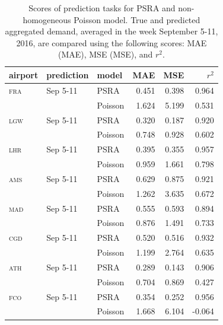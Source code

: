 \documentclass[final,review]{elsarticle}
\newcommand{\airp}[1]{\textcolor{#1}{\textsc{#1}}}
\begin{document}
\begin{table}
  \centering
  \caption{Scores of prediction tasks for \acs{PSRA} and non-homogeneous Poisson model. True and predicted aggregated demand, averaged in the week September 5-11, 2016, are compared using the following scores: \acl{MAE} (\acs{MAE}), \acl{MSE} (\acs{MSE}), and \(r^2\).}
  \label{tab:predictions_last_week}
  \begin{tabular}{lllrrr}
    \toprule
    airport    & prediction & model & \acs{MAE} & \acs{MSE} & \(r^2\)  \\
    \midrule
    \airp{fra} & Sep 5-11  & \acs{PSRA} &  0.451 &   0.398 &  0.964 \\
         &                  & Poisson    &  1.624 &   5.199 &  0.531 \\
    \airp{lgw} & Sep 5-11  & \acs{PSRA} &  0.320 &   0.187 &  0.920 \\
         &                  & Poisson    &  0.748 &   0.928 &  0.602 \\
    \airp{lhr} & Sep 5-11  & \acs{PSRA} &  0.395 &   0.355 &  0.957 \\
         &                  & Poisson    &  0.959 &   1.661 &  0.798 \\
    \airp{ams} & Sep 5-11  & \acs{PSRA} &  0.629 &   0.875 &  0.921 \\
         &                  & Poisson    &  1.262 &   3.635 &  0.672 \\
    \airp{mad} & Sep 5-11  & \acs{PSRA} &  0.555 &   0.593 &  0.894 \\
         &                  & Poisson    &  0.876 &   1.491 &  0.733 \\
    \airp{cgd} & Sep 5-11  & \acs{PSRA} &  0.520 &   0.516 &  0.932 \\
         &                  & Poisson    &  1.199 &   2.764 &  0.635 \\
    \airp{ath} & Sep 5-11  & \acs{PSRA} &  0.289 &   0.143 &  0.906 \\
         &                  & Poisson    &  0.704 &   0.869 &  0.427 \\
    \airp{fco} & Sep 5-11  & \acs{PSRA} &  0.354 &   0.252 &  0.956 \\
         &                  & Poisson    &  1.668 &   6.104 & -0.064 \\
    \bottomrule
  \end{tabular}
\end{table}
\end{document}
